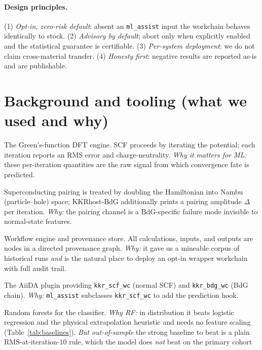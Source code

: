 \documentclass[11pt]{article}
\newcommand{\code}[1]{\texttt{#1}}
\begin{document}
\paragraph{Design principles.} (1) \emph{Opt-in, zero-risk default}: absent an \code{ml\_assist} input the
workchain behaves identically to stock. (2) \emph{Advisory by default}; abort only when explicitly enabled
and the statistical guarantee is certifiable. (3) \emph{Per-system deployment}: we do not claim
cross-material transfer. (4) \emph{Honesty first}: negative results are reported as-is and are publishable.

\section{Background and tooling (what we used and why)}
\label{sec:tools}
\begin{description}[leftmargin=1.6em,itemsep=2pt]
  \item[JuKKR (KKRhost, voronoi, KKRimp).] The Green's-function DFT engine. SCF proceeds by iterating
  the potential; each iteration reports an RMS error and charge-neutrality. \emph{Why it matters for ML:}
  these per-iteration quantities are the raw signal from which convergence fate is predicted.
  \item[BdG extension.] Superconducting pairing is treated by doubling the Hamiltonian into
  Nambu (particle--hole) space; KKRhost-BdG additionally prints a pairing amplitude $\Delta$ per iteration.
  \emph{Why:} the pairing channel is a BdG-specific failure mode invisible to normal-state features.
  \item[AiiDA 2.7.] Workflow engine and provenance store. All calculations, inputs, and outputs are nodes
  in a directed provenance graph. \emph{Why:} it gave us a mineable corpus of historical runs \emph{and}
  is the natural place to deploy an opt-in wrapper workchain with full audit trail.
  \item[aiida-kkr.] The AiiDA plugin providing \code{kkr\_scf\_wc} (normal SCF) and \code{kkr\_bdg\_wc}
  (BdG chain). \emph{Why:} \code{ml\_assist} subclasses \code{kkr\_scf\_wc} to add the prediction hook.
  \item[scikit-learn (training only).] Random forests for the classifier. \emph{Why RF:} in distribution
  it beats logistic regression and the physical extrapolation heuristic and needs no feature scaling
  (Table~\ref{tab:baselines}). \emph{But out-of-sample} the strong baseline to beat is a plain
  RMS-at-iteration-10 rule, which the model does \emph{not} beat on the primary cohort

\end{description}
\end{document}
